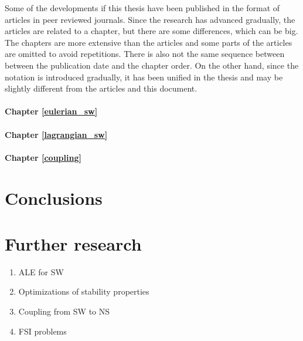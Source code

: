 Some of the developments if this thesis have been published in the format of articles in peer reviewed journals. Since the research has advanced gradually, the articles are related to a chapter, but there are some differences, which can be big.
The chapters are more extensive than the articles and some parts of the articles are omitted to avoid repetitions.
There is also not the same sequence between between the publication date and the chapter order.
On the other hand, since the notation is introduced gradually, it has been unified in the thesis and may be slightly different from the articles and this document.

\paragraph{Chapter \ref{eulerian_sw}} 
\paragraph{Chapter \ref{lagrangian_sw}} 
\paragraph{Chapter \ref{coupling}} 




\section{Conclusions}





\section{Further research}


\begin{enumerate}
    \item ALE for SW
    \item Optimizations of stability properties
    \item Coupling from SW to NS
    \item FSI problems
\end{enumerate}

